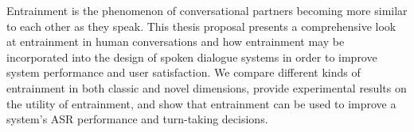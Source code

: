 Entrainment is the phenomenon of conversational partners becoming more similar to each other as they speak. This thesis proposal presents a comprehensive look
 at entrainment in human conversations and how entrainment may be incorporated
 into the design of spoken dialogue systems in order to improve system
 performance and user satisfaction. We compare different kinds of entrainment in
 both classic and novel dimensions, provide experimental results on the utility
 of entrainment, and show that entrainment can be used to improve a system's ASR
 performance and turn-taking decisions.

